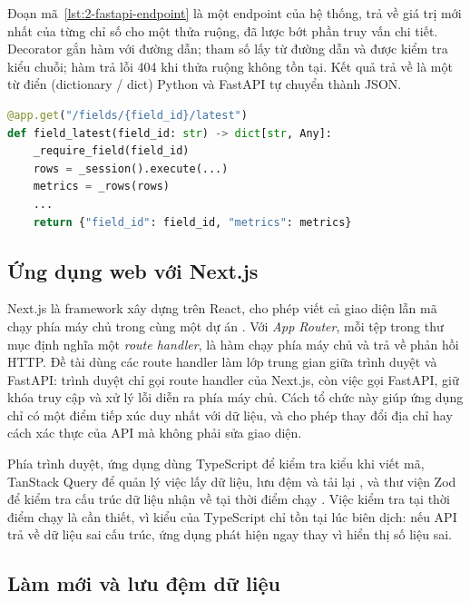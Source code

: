 Đoạn mã~\ref{lst:2-fastapi-endpoint} là một endpoint của hệ thống, trả về giá trị mới nhất của từng chỉ số cho một thửa ruộng, đã lược bớt phần truy vấn chi tiết. Decorator  gắn hàm với đường dẫn; tham số  lấy từ đường dẫn và được kiểm tra kiểu chuỗi; hàm  trả lỗi 404 khi thửa ruộng không tồn tại. Kết quả trả về là một từ điển (dictionary / dict) Python và FastAPI tự chuyển thành JSON.

\begin{lstlisting}[language=Python, caption={Endpoint trả giá trị mới nhất của một thửa ruộng (rút gọn)}, label={lst:2-fastapi-endpoint}]
@app.get("/fields/{field_id}/latest")
def field_latest(field_id: str) -> dict[str, Any]:
    _require_field(field_id)
    rows = _session().execute(...)
    metrics = _rows(rows)
    ...
    return {"field_id": field_id, "metrics": metrics}
\end{lstlisting}

\subsection{Ứng dụng web với Next.js}
\label{sec:2-nextjs}

Next.js là framework xây dựng trên React, cho phép viết cả giao diện lẫn mã chạy phía máy chủ trong cùng một dự án \cite{nextjs_docs}. Với \emph{App Router}, mỗi tệp  trong thư mục  định nghĩa một \emph{route handler}, là hàm chạy phía máy chủ và trả về phản hồi HTTP. Đề tài dùng các route handler làm lớp trung gian giữa trình duyệt và FastAPI: trình duyệt chỉ gọi route handler của Next.js, còn việc gọi FastAPI, giữ khóa truy cập và xử lý lỗi diễn ra phía máy chủ. Cách tổ chức này giúp ứng dụng chỉ có một điểm tiếp xúc duy nhất với dữ liệu, và cho phép thay đổi địa chỉ hay cách xác thực của API mà không phải sửa giao diện.

Phía trình duyệt, ứng dụng dùng TypeScript để kiểm tra kiểu khi viết mã, TanStack Query để quản lý việc lấy dữ liệu, lưu đệm và tải lại \cite{tanstack_query}, và thư viện Zod để kiểm tra cấu trúc dữ liệu nhận về tại thời điểm chạy \cite{zod_docs}. Việc kiểm tra tại thời điểm chạy là cần thiết, vì kiểu của TypeScript chỉ tồn tại lúc biên dịch: nếu API trả về dữ liệu sai cấu trúc, ứng dụng phát hiện ngay thay vì hiển thị số liệu sai.

\subsection{Làm mới và lưu đệm dữ liệu}
\label{sec:2-refresh-cache}

